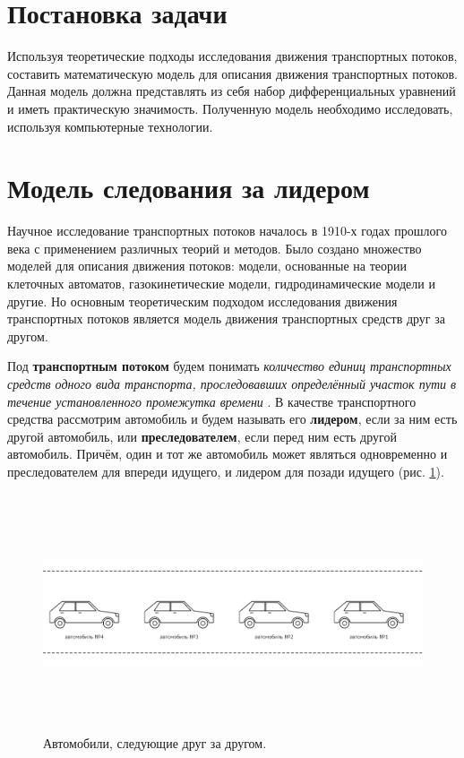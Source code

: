 \documentclass[12pt, a4paper]{extarticle}
\numberwithin{equation}{section}
\begin{document}
\newpage
\section{Постановка задачи} 
Используя теоретические подходы исследования движения транспортных потоков, составить математическую модель для описания движения транспортных потоков. Данная модель должна представлять из себя набор дифференциальных уравнений и иметь практическую значимость. Полученную модель необходимо исследовать, используя компьютерные технологии.   

\newpage
\section{Модель следования за лидером}
Научное исследование транспортных потоков началось в 1910-х годах прошлого века с применением различных теорий и методов. Было создано множество моделей для описания движения потоков: модели, основанные на теории клеточных автоматов, газокинетические модели, гидродинамические модели и другие. Но основным теоретическим подходом исследования движения транспортных потоков является  модель движения транспортных средств друг за другом.

Под \textbf{транспортным потоком} будем понимать {\it количество единиц транспортных средств одного вида транспорта, проследовавших определённый участок пути в течение установленного промежутка времени} \cite{TrafficFlow}. В качестве транспортного средства рассмотрим автомобиль и будем называть его \textbf{лидером}, если за ним есть другой автомобиль, или \textbf{преследователем}, если перед ним есть другой автомобиль. Причём, один и тот же автомобиль может являться одновременно и преследователем для впереди идущего, и лидером для позади идущего (рис. \ref{car_following}). 

\begin{figure}[h!]  
	\begin{center}
		\includegraphics[keepaspectratio,width=160mm,height=70mm]{Images/car_following.png}
	\end{center}
	\caption{Автомобили, следующие друг за другом.}
	\label{car_following}
\end{figure}
\end{document}
